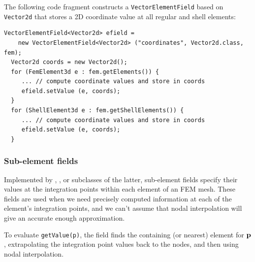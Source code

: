 The following code fragment constructs a {\tt VectorElementField}
based on {\tt Vector2d} that stores a 2D coordinate value at all
regular and shell elements:
%
\begin{lstlisting}[]
  VectorElementField<Vector2d> efield =
    new VectorElementField<Vector2d> ("coordinates", Vector2d.class, fem);
  Vector2d coords = new Vector2d();
  for (FemElement3d e : fem.getElements()) {
     ... // compute coordinate values and store in coords
     efield.setValue (e, coords);
  }
  for (ShellElement3d e : fem.getShellElements()) {
     ... // compute coordinate values and store in coords
     efield.setValue (e, coords);
  }
\end{lstlisting}
%

\subsubsection{Sub-element fields}

Implemented by
,
, 
or subclasses of the latter, sub-element fields specify their values
at the integration points within each element of an FEM mesh. These
fields are used when we need precisely computed information at each of
the element's integration points, and we can't assume that nodal
interpolation will give an accurate enough approximation.

To evaluate {\tt getValue(p)}, the field finds the containing (or
nearest) element for ${\bf p}$, extrapolating the integration point values
back to the nodes, and then using nodal interpolation.

